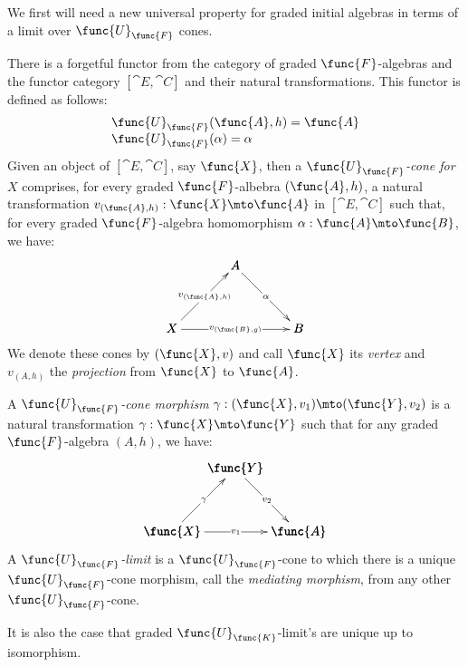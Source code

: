 \newcommand{\UFunc}[1]{\func{U}_{\func{#1}}}
\newcommand{\UCone}[1]{$\UFunc{#1}$-cone}
\newcommand{\ULimit}[1]{graded $\UFunc{#1}$-limit}

We first will need a new universal property for graded initial
algebras in terms of a limit over $\UFunc{F}$ cones.
%   
\begin{definition}
\label{def:forgetful_limits}
    There is a forgetful functor from the category of graded
    $\func{F}$-algebras and the functor category $[\cat{E},\cat{C}]$ and
    their natural transformations. This functor is defined as follows:
    \[
        \begin{array}{lll}
            \func{U}_\func{F}(\func{A},h) = \func{A}\\
            \func{U}_\func{F}(\alpha) = \alpha
        \end{array}
    \]
    Given an object of $[\cat{E},\cat{C}]$, say $\func{X}$, then a
    \emph{$\func{U}_\func{F}$-cone for $X$} comprises, for every graded
    $\func{F}$-albebra $(\func{A},h)$, a natural transformation 
    $v_{(\func{A},h)} : \func{X} \mto \func{A}$ in $[\cat{E},\cat{C}]$
    such that, for every graded $\func{F}$-algebra homomorphism $\alpha :
    \func{A} \mto \func{B}$, we have:
    \[
         \bfig
             \Atriangle(0,0)|mmm|/<-`->`->/<500,500>[
                 A`
                 X`
                 B;
                 v_{(\func{A},h)}`
                 \alpha`
                 v_{(\func{B},g)}
             ]
         \efig
    \]
    We denote these cones by $(\func{X},v)$ and call $\func{X}$ its
    \emph{vertex} and $v_{(A,h)}$ the \emph{projection} from $\func{X}$ to
    $\func{A}$. 
    
    A \emph{$\func{U}_\func{F}$-cone morphism} $\gamma : (\func{X},v_1) \mto
    (\func{Y},v_2)$ is a natural transformation $\gamma : \func{X} \mto
    \func{Y}$ such that for any graded $\func{F}$-algebra $(A,h)$, we
    have:
    \[
         \bfig
             \Atriangle(0,0)|mmm|/<-`->`->/<500,500>[
                 \func{Y}`
                 \func{X}`
                 \func{A};
                 \gamma`
                 v_2`
                 v_1
             ]
         \efig
    \]
    A \emph{$\func{U}_\func{F}$-limit} is a
    $\func{U}_\func{F}$-cone to which there is a unique
    $\func{U}_\func{F}$-cone morphism, call the \emph{mediating morphism},
    from any other $\func{U}_\func{F}$-cone.
\end{definition}
\noindent
It is also the case that \ULimit{K}'s are unique up to isomorphism.
